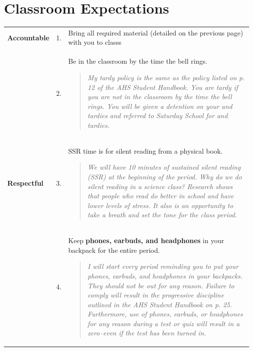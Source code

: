 \documentclass[10pt]{exam}
\newcommand{\mg}{\rowcolor{Goldenrod}}
\begin{document}
\section*{Classroom Expectations}

\begin{center}
  \begin{tabular}
    {
      p{2.2cm}
      p{0.28cm}
      p{12.7cm}
		}
		
    \hline
      \mg \bf Accountable 
      &  1. & 
			Bring all required material (detailed on the previous page) with 	you to classs
      \\
      \mg   
			&  2. & 
			Be in the classroom by the time the bell rings.
			  \vspace{-1em}
				\begin{quotation}
					\noindent\small
					\textit{My tardy policy is the same as the policy listed on p. 12  of the AHS Student Handbook.  You are tardy if you are not in the classroom by the time the bell rings.  You will be given a detention on your \nth{3} and \nth{4} tardies and referred to Saturday School for \nth{5} and \nth{6} tardies.}
					\vspace{-1em}
				\end{quotation}
      \\
    \hline
    \bf Respectful
          &  3. &
					SSR time is for silent reading from a physical book.
						\vspace{-1em}
						\begin{quotation}
							\noindent\small
							\textit{We will have 10 minutes of sustained silent reading (SSR) at the beginning of the period.  Why do we do silent reading in a science class?  Research shows that people who read do better in school and have lower levels of stress.  It also is an opportunity to take a breath and set the tone for the class period.}
							\vspace{-1em}
						\end{quotation}
          \\   
          &  4. & 
					Keep \textbf{phones, earbuds, and headphones} in your backpack for the entire period.  
						\vspace{-2em}
						\begin{quotation}
							\noindent\small
							\textit{I will start every period reminding you to put your phones, earbuds, and headphones in your backpacks. They should not be out for any reason.  Failure to comply will result in the progressive discipline outlined in the AHS Student Handbook on p. 25.  Furthermore, use of phones, earbuds, or headphones for any reason during a test or quiz will result in a zero--even if the test has been turned in.}
							\vspace{-1em}
						\end{quotation}     
          \\  


\end{tabular}
\end{center}
\end{document}
